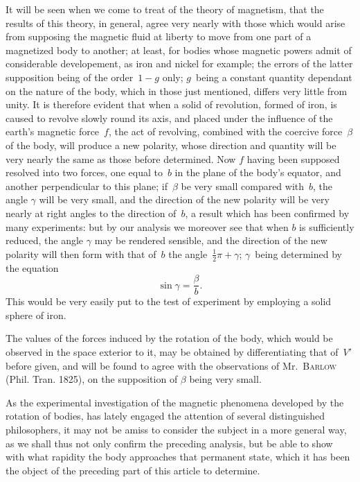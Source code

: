 \documentclass[11pt,notitlepage]{amsart}
\let\Person\textsc
\begin{document}
It will be seen when we come to treat of the theory of magnetism,
that the results of this theory, in general, agree very nearly with those which
would arise from supposing the magnetic fluid at liberty to move from one
part of a magnetized body to another; at least, for bodies whose magnetic
powers admit of considerable developement, as iron and nickel for example;
the errors of the latter supposition being of the order~$1-g$ only; $g$~being
a constant quantity dependant on the nature of the body, which in those just
mentioned, differs very little from unity. It is therefore evident that when
a solid of revolution, formed of iron, is caused to revolve slowly round its
axis, and placed under the influence of the earth's magnetic force~$f$, the act
of revolving, combined with the coercive force~$\beta$ of the body, will produce
a new polarity, whose direction and quantity will be very nearly the same
as those before determined. Now $f$ having been supposed resolved into two
forces, one equal to~$b$ in the plane of the body's equator, and another 
perpendicular to this plane;
if~$\beta$ be very small compared with~$b$, the angle $\gamma$
will be very small, and the direction of the new polarity will be very nearly
at right angles to the direction of~$b$, a result which has been confirmed by
many experiments: but by our analysis we moreover see that when $b$ is 
sufficiently reduced, the angle $\gamma$ may be rendered sensible,
and the direction of
the new polarity will then form with that of~$b$
the angle~$\tfrac12\pi+\gamma$; $\gamma$~being
determined by the equation
\[
\sin\gamma=\frac\beta b.
\]
This would be very easily put to the test of experiment by employing a
solid sphere of iron.

The values of the forces induced by the rotation of the body, which
would be observed in the space exterior to it, may be obtained by 
differentiating that of~$V'$ before given,
and will be found to agree with the observations
of Mr.~\Person{Barlow} (Phil. Tran. 1825),
on the supposition of $\beta$ being
very small.

As the experimental investigation of the magnetic phenomena developed
by the rotation of bodies,
has lately engaged the attention of several distinguished
philosophers, it may not be amiss to consider the subject in a more general
way, as we shall thus not only confirm the preceding analysis, but be able
to show with what rapidity the body approaches that permanent state, which
it has been the object of the preceding part of this article to determine.
\end{document}
